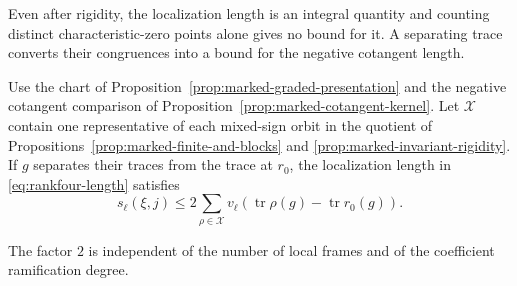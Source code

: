Even after rigidity, the localization length is an integral quantity and counting distinct characteristic-zero points alone gives no bound for it. A separating trace converts their congruences into a bound for the negative cotangent length.

\begin{proposition}\label{prop:marked-trace-length}
Use the chart of Proposition~\ref{prop:marked-graded-presentation}
and the negative cotangent comparison of
Proposition~\ref{prop:marked-cotangent-kernel}. Let \(\mathcal X\) contain
one representative of each mixed-sign orbit in the quotient of
Propositions~\ref{prop:marked-finite-and-blocks} and
\ref{prop:marked-invariant-rigidity}. If \(g\) separates their traces
from the trace at \(r_0\), the localization length in \eqref{eq:rankfour-length} satisfies 
\[
 s_\ell(\xi,j)\le2\sum_{\rho\in\mathcal X} v_\ell\!\left(\operatorname{tr}\rho(g)-\operatorname{tr}r_0(g)\right).
\]

The factor \(2\) is independent of the number of local frames and of
the coefficient ramification degree.
\end{proposition}

